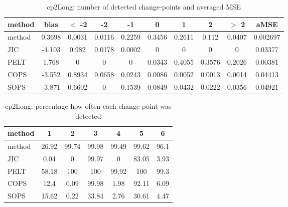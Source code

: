 \begin{table}[ht]
\centering
\begin{tabular}{l|c|ccccccc|c}
  \hline
method & bias & $<$ -2 & -2 & -1 & 0 & 1 & 2 & $>$ 2 & aMSE \\ 
  \hline
method & 0.3698 & 0.0031 & 0.0116 & 0.2259 & 0.3456 & 0.2611 & 0.112 & 0.0407 & 0.002697 \\ 
  JIC & -4.103 & 0.982 & 0.0178 & 0.0002 &     0 &     0 &     0 &     0 & 0.03377 \\ 
  PELT & 1.768 &     0 &     0 &     0 & 0.0343 & 0.4055 & 0.3576 & 0.2026 & 0.00381 \\ 
  COPS & -3.552 & 0.8934 & 0.0658 & 0.0243 & 0.0086 & 0.0052 & 0.0013 & 0.0014 & 0.04413 \\ 
  SOPS & -3.871 & 0.6602 &     0 & 0.1539 & 0.0849 & 0.0432 & 0.0222 & 0.0356 & 0.04921 \\ 
   \hline
\end{tabular}
\caption{cp2Long: number of detected change-points and averaged MSE} 
\label{tab:cp2LongNjumps}
\end{table}
\begin{table}[ht]
\centering
\begin{tabular}{l|cccccc}
  \hline
method & 1 & 2 & 3 & 4 & 5 & 6 \\ 
  \hline
method &  26.92 &  99.74 &  99.98 &  99.49 &  99.62 &   96.1 \\ 
  JIC &   0.04 &      0 &  99.97 &      0 &  83.05 &   3.93 \\ 
  PELT &  58.18 &    100 &    100 &  99.92 &    100 &   99.3 \\ 
  COPS &   12.4 &   0.09 &  99.98 &   1.98 &  92.11 &   6.09 \\ 
  SOPS &  15.62 &   0.22 &  33.84 &   2.76 &  30.61 &   4.47 \\ 
   \hline
\end{tabular}
\caption{cp2Long: percentage how often each change-point was detected} 
\label{tab:cp2LongDetections}
\end{table}
